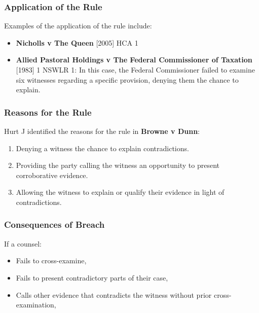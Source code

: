 \subsubsection{Application of the Rule}\label{application-of-the-rule}

Examples of the application of the rule include:

\begin{itemize}
\tightlist
\item
  \textbf{Nicholls v The Queen} {[}2005{]} HCA 1
\item
  \textbf{Allied Pastoral Holdings v The Federal Commissioner of
  Taxation} {[}1983{]} 1 NSWLR 1: In this case, the Federal Commissioner
  failed to examine six witnesses regarding a specific provision,
  denying them the chance to explain.
\end{itemize}

\subsubsection{Reasons for the Rule}\label{reasons-for-the-rule}

Hurt J identified the reasons for the rule in \textbf{Browne v Dunn}:

\begin{enumerate}
\def\labelenumi{\arabic{enumi}.}
\tightlist
\item
  Denying a witness the chance to explain contradictions.
\item
  Providing the party calling the witness an opportunity to present
  corroborative evidence.
\item
  Allowing the witness to explain or qualify their evidence in light of
  contradictions.
\end{enumerate}

\subsubsection{Consequences of Breach}\label{consequences-of-breach}

If a counsel:

\begin{itemize}
\tightlist
\item
  Fails to cross-examine,
\item
  Fails to present contradictory parts of their case,
\item
  Calls other evidence that contradicts the witness without prior
  cross-examination,
\end{itemize}

